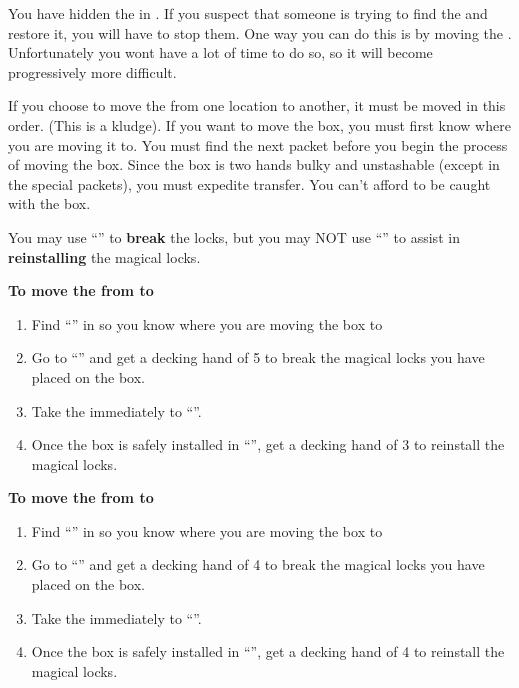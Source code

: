 \documentclass[green]{NeptuneBall}
\begin{document}
\name{\gMoveMusicBox{}}

You have hidden the \iMusicBox{} in \sPacketA{\MYloc{}}. If you suspect that someone is trying to find the \iMusicBox{} and restore it, you will have to stop them. One way you can do this is by moving the \iMusicBox{}. Unfortunately you wont have a lot of time to do so, so it will become progressively more difficult. 

If you choose to move the \iMusicBox{} from one location to another, it must be moved in this order. (This is a kludge). If you want to move the box, you must first know where you are moving it to. You must find the next packet before you begin the process of moving the box. Since the box is two hands bulky and unstashable (except in the special packets), you must expedite transfer. You can't afford to be caught with the box.

You may use ``\aLesserDispel{}'' to {\bf break} the locks, but you may NOT use ``\aLesserDispel{}'' to assist in {\bf reinstalling} the magical locks.

{\bf To move the \iMusicBox{} from \sPacketA{\MYloc{}} to \sPacketB{\MYloc{}}}
\begin{enumerate}
  \item Find ``\sPacketB{}'' in \sPacketB{\MYloc{}} so you know where you are moving the box to
  \item Go to ``\sPacketA{}'' and get a decking hand of 5 to break the magical locks you have placed on the box. 
  \item Take the \iMusicBox{} immediately to ``\sPacketB{}''. 
  \item Once the box is safely installed in ``\sPacketB{}'', get a decking hand of 3 to reinstall the magical locks.
\end{enumerate}

{\bf To move the \iMusicBox{} from \sPacketB{\MYloc{}} to \sPacketC{\MYloc{}}}
\begin{enumerate}
  \item Find ``\sPacketC{}'' in \sPacketC{\MYloc{}} so you know where you are moving the box to
  \item Go to ``\sPacketB{}'' and get a decking hand of 4 to break the magical locks you have placed on the box. 
  \item Take the \iMusicBox{} immediately to ``\sPacketC{}''. 
  \item Once the box is safely installed in ``\sPacketC{}'', get a decking hand of 4 to reinstall the magical locks.
\end{enumerate}
\end{document}
